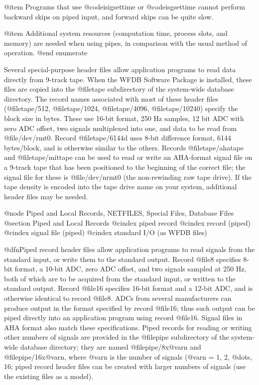 {{{{{{{{{{@item
Programs that use @code{isigsettime} or @code{isgsettime} cannot perform
backward skips on piped input, and forward skips can be quite slow.

@item
Additional system resources (computation time, process slots, and
memory) are needed when using pipes, in comparison with the usual
method of operation.
@end enumerate

Several special-purpose header files allow application programs to read data
directly from 9-track tape.  When the WFDB Software Package is installed, these
files are copied into the @file{tape} subdirectory of the system-wide database
directory.  The record names associated with most of these header files
(@file{tape/512}, @file{tape/1024}, @file{tape/4096}, @file{tape/10240})
specify the block size in bytes.  These use 16-bit format, 250 Hz samples, 12
bit ADC with zero ADC offset, two signals multiplexed into one, and data to be
read from @file{/dev/rmt0}.  Record @file{tape/6144d} uses 8-bit difference
format, 6144 bytes/block, and is otherwise similar to the others.  Records
@file{tape/ahatape} and @file{tape/mittape} can be used to read or write an
AHA-format signal file on a 9-track tape that has been positioned to the
beginning of the correct file; the signal file for these is @file{/dev/nrmt0}
(the non-rewinding raw tape drive).  If the tape density is encoded into the
tape drive name on your system, additional header files may be needed.

@node     Piped and Local Records, NETFILES, Special Files, Database Files
@section Piped and Local Records
@cindex piped record
@cindex record (piped)
@cindex signal file (piped)
@cindex standard I/O (as WFDB files)

@dfn{Piped record} header files allow application programs to read signals from
the standard input, or write them to the standard output.  Record @file{8}
specifies 8-bit format, a 10-bit ADC, zero ADC offset, and two signals sampled
at 250 Hz, both of which are to be acquired from the standard input, or written
to the standard output.  Record @file{16} specifies 16-bit format and a 12-bit
ADC, and is otherwise identical to record @file{8}.  ADCs from several
manufacturers can produce output in the format specified by record @file{16};
thus such output can be piped directly into an application program using record
@file{16}.  Signal files in AHA format also match these specifications.  Piped
records for reading or writing other numbers of signals are provided in the
@file{pipe} subdirectory of the system-wide database directory; they are named
@file{pipe/8x@var{n}} and @file{pipe/16x@var{n}}, where @var{n} is the number
of signals (@var{n} = 1, 2, @dots{}, 16; piped record header files can be
created with larger numbers of signals (use the existing files as a model).

}}}}}}}}}}
